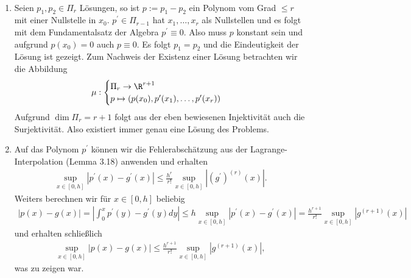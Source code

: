\begin{solution}
\leavevmode \\
\begin{enumerate}[label = \textbf{\alph*)}]
  \item Seien $p_1,p_2 \in \Pi_r$ Lösungen, so ist $p := p_1 - p_2$ ein Polynom vom Grad $\leq r$
  mit einer Nullstelle in $x_0$.
  $p^{\prime} \in \Pi_{r-1}$ hat $x_1,\dots,x_r$ als Nullstellen und es folgt mit
  dem Fundamentalsatz der Algebra $p^{\prime} \equiv 0$. Also muss $p$ konstant
  sein und aufgrund $p(x_0) = 0$ auch $p \equiv 0$. Es folgt $p_1 = p_2$ und die
  Eindeutigkeit der Lösung ist gezeigt.
  Zum Nachweis der Existenz einer Lösung betrachten wir die Abbildung
  \begin{align*}
    \mu: \begin{cases}
      \Pi_r \rightarrow \R^{r+1} \\
      p \mapsto (p(x_0),p^{\prime}(x_1),\dots,p^{\prime}(x_r))
    \end{cases}
  \end{align*}
  Aufgrund $\dim \Pi_r = r + 1$ folgt aus der eben bewiesenen Injektivität auch
  die Surjektivität. Also existiert immer genau eine Lösung des Problems.
  \item Auf das Polynom $p^{\prime}$ können wir die Fehlerabschätzung aus der
  Lagrange-Interpolation (Lemma 3.18) anwenden und erhalten
  \begin{align*}
      \sup_{x \in [0,h]} |p^{\prime}(x) - g^{\prime}(x)| \leq \frac{h^{r}}{r!}\sup_{x \in [0,h]} |(g^{\prime})^{(r)}(x)|.
  \end{align*}
  Weiters berechnen wir für $x \in [0,h]$ beliebig
  \begin{align*}
    |p(x) - g(x)| = \left|\int_0^x p^{\prime}(y) - g^{\prime}(y) dy \right| \leq h \sup_{x \in [0,h]} |p^{\prime}(x) - g^{\prime}(x)| =
    \frac{h^{r+1}}{r!}\sup_{x \in [0,h]} |g^{(r + 1)}(x)|
  \end{align*}
  und erhalten schließlich
  \begin{align*}
  \sup_{x \in [0,h]} |p(x) - g(x)| \leq \frac{h^{r+1}}{r!}
  \sup_{x \in [0,h]}\left|g^{(r + 1)}(x)\right|,
  \end{align*}
  was zu zeigen war.
\end{enumerate}

\end{solution}
